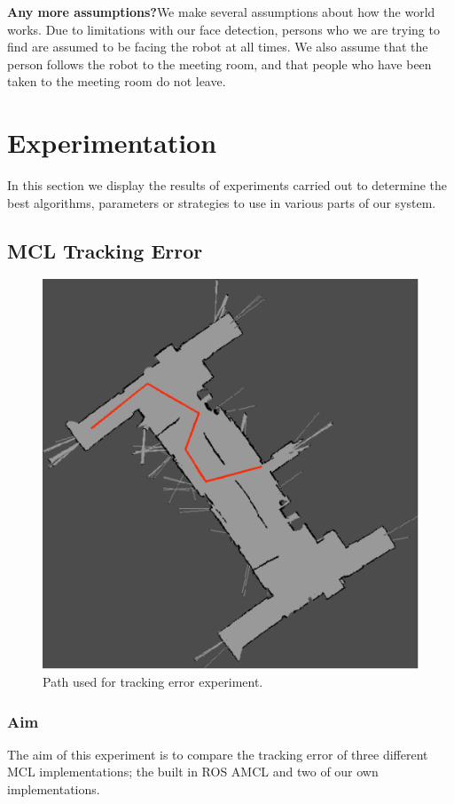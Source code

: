 \documentclass[conference]{IEEEtran}
\begin{document}
\textbf{Any more assumptions?}We make several assumptions about how the world works. Due to limitations with our face detection, persons who we are trying to find are assumed to be facing the robot at all times. We also assume that the person follows the robot to the meeting room, and that people who have been taken to the meeting room do not leave.

\section{Experimentation}
In this section we display the results of experiments carried out to determine the best algorithms, parameters or strategies to use in various parts of our system.
\subsection{MCL Tracking Error}
\begin{figure}
  \includegraphics[width=\columnwidth]{localisation-experiment-path}
  \caption{Path used for tracking error experiment.}
  \label{fig:locpath}
\end{figure}
\subsubsection{Aim}
The aim of this experiment is to compare the tracking error of three different MCL implementations; the built in ROS AMCL and two of our own implementations.
\end{document}
